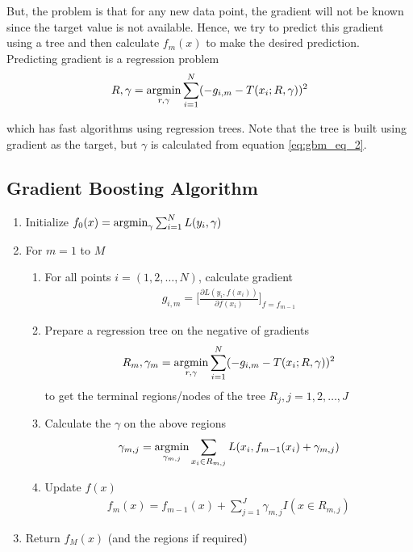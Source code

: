 \documentclass[../statistical_learning_notes.tex]{subfiles}
\begin{document}
But, the problem is that for any new data point, the gradient will not be known since the target value is not available. Hence, we try to predict this gradient using a tree and then calculate $f_{m}(x)$ to make the desired prediction. Predicting gradient is a regression problem
\begin{align*}
    R, \gamma = \operatorname*{argmin}_{r, \gamma} \sum_{i=1}^{N} (-g_{i,m} - T(x_{i}; R, \gamma))^{2}
\end{align*}

which has fast algorithms using regression trees. Note that the tree is built using gradient as the target, but $\gamma$ is calculated from equation \eqref{eq:gbm_eq_2}.


\subsection{Gradient Boosting Algorithm}
\begin{enumerate}
    \item Initialize $f_{0}(x) = \operatorname*{argmin}_{\gamma} \sum_{i=1}^{N} L(y_{i}, \gamma)$
    \item For $m=1$ to $M$
    \begin{enumerate}
        \item For all points $i = (1, 2, \ldots, N)$, calculate gradient
        \begin{align*}
            g_{i, m} = \bigg[ \frac{\partial L(y_{i}, f(x_{i}))}{\partial f(x_{i})} \bigg]_{f=f_{m-1}}
        \end{align*}
        \item Prepare a regression tree on the negative of gradients
        \begin{align*}
            R_{m}, \gamma_{m} = \operatorname*{argmin}_{r, \gamma} \sum_{i=1}^{N} (-g_{i,m} - T(x_{i}; R, \gamma))^{2}
        \end{align*}
        to get the terminal regions/nodes of the tree $R_{j}, j=1,2,\ldots,J$
        \item Calculate the $\gamma$ on the above regions
        \begin{align*}
            \gamma_{m,j} = \operatorname*{argmin}_{\gamma_{m,j}} \sum_{x_{i} \in R_{m,j}} L(x_{i}, f_{m-1}(x_{i}) + \gamma_{m,j})
        \end{align*}
        \item Update $f(x)$
        \begin{align*}
            f_{m}(x) = f_{m-1}(x) + \sum_{j=1}^{J} \gamma_{m,j} I(x \in R_{m,j})
        \end{align*}
    \end{enumerate}
    \item Return $f_{M}(x)$ (and the regions if required)
\end{enumerate}
\end{document}
